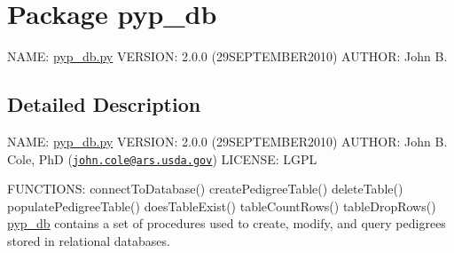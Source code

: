 \hypertarget{namespacepyp__db}{
\section{Package pyp\_\-db}
\label{namespacepyp__db}
}


NAME: \hyperlink{pyp__db_8py_source}{pyp\_\-db.py} VERSION: 2.0.0 (29SEPTEMBER2010) AUTHOR: John B.  




\subsection{Detailed Description}
NAME: \hyperlink{pyp__db_8py_source}{pyp\_\-db.py} VERSION: 2.0.0 (29SEPTEMBER2010) AUTHOR: John B. Cole, PhD (\href{mailto:john.cole@ars.usda.gov}{\tt john.cole@ars.usda.gov}) LICENSE: LGPL

FUNCTIONS: connectToDatabase() createPedigreeTable() deleteTable() populatePedigreeTable() doesTableExist() tableCountRows() tableDropRows() \hyperlink{namespacepyp__db}{pyp\_\-db} contains a set of procedures used to create, modify, and query pedigrees stored in relational databases. 
